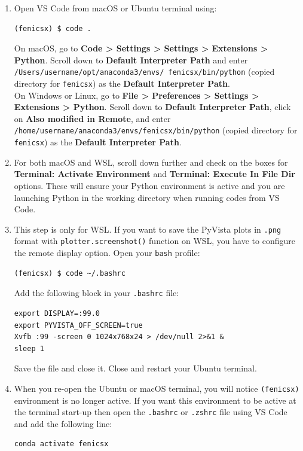\documentclass[12pt]{article}
\begin{document}
\begin{enumerate}[label={\arabic*.}, leftmargin= 0.6 cm,itemsep = 0.2cm,topsep=.2cm, parsep=0.2cm]
This will return all the environments within Anaconda. Copy the directory for \texttt{fenicsx} environment.

\item Open VS Code from macOS or Ubuntu terminal using:
\begin{lstlisting}[style=terminal]
(fenicsx) $ code .
\end{lstlisting}

On macOS, go to \textbf{Code > Settings > Settings > Extensions > Python}. Scroll down to \textbf{Default Interpreter Path} and enter \texttt{/Users/username/opt/anaconda3/envs/ fenicsx/bin/python} (copied directory for \texttt{fenicsx}) as the \textbf{Default Interpreter Path}. \\

On Windows or Linux, go to \textbf{File > Preferences > Settings > Extensions > Python}. Scroll down to \textbf{Default Interpreter Path}, click on \textbf{Also modified in Remote}, and enter \texttt{/home/username/anaconda3/envs/fenicsx/bin/python} (copied directory for \texttt{fenicsx}) as the \textbf{Default Interpreter Path}.

\item For both macOS and WSL, scroll down further and check on the boxes for \textbf{Terminal: Activate Environment} and \textbf{Terminal: Execute In File Dir} options. These will ensure your Python environment is active and you are launching Python in the working directory when running codes from VS Code.

\item This step is only for WSL. If you want to save the PyVista plots in \texttt{.png} format with \texttt{plotter.screenshot()} function on WSL, you have to configure the remote display option. Open your \texttt{bash} profile:
\begin{lstlisting}[style=terminal]
(fenicsx) $ code ~/.bashrc
\end{lstlisting}

Add the following block in your \texttt{.bashrc} file:
\begin{lstlisting}[style=terminal]
export DISPLAY=:99.0
export PYVISTA_OFF_SCREEN=true
Xvfb :99 -screen 0 1024x768x24 > /dev/null 2>&1 &
sleep 1
\end{lstlisting}

Save the file and close it. Close and restart your Ubuntu terminal.

\item When you re-open the Ubuntu or macOS terminal, you will notice \texttt{(fenicsx)} environment is no longer active. If you want this environment to be active at the terminal start-up then open the \texttt{.bashrc} or \texttt{.zshrc} file using VS Code and add the following line:
\begin{lstlisting}[style=terminal]
conda activate fenicsx
\end{lstlisting}


\end{enumerate}
\end{document}
